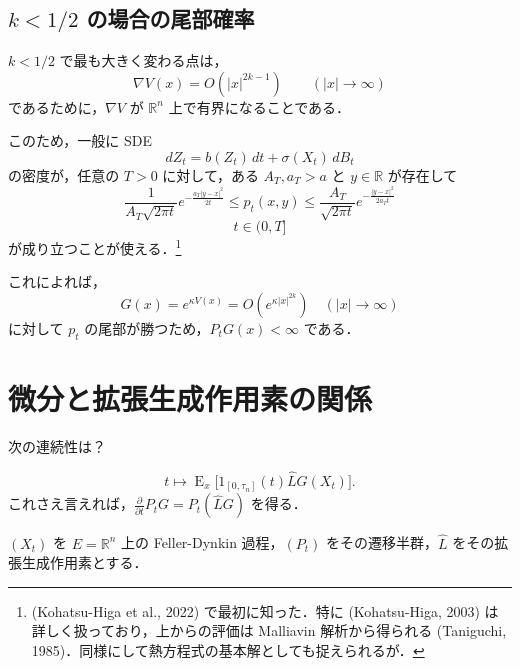 \documentclass[
]{article}
\begin{document}
\subsection{\texorpdfstring{\(k<1/2\)
の場合の尾部確率}{k\textless1/2 の場合の尾部確率}}\label{k12-ux306eux5834ux5408ux306eux5c3eux90e8ux78baux7387}

\(k<1/2\) で最も大きく変わる点は， \[
\nabla V(x)=O(\lvert x\rvert^{2k-1})\qquad(\lvert x\rvert\to\infty)
\] であるために，\(\nabla V\) が \(\mathbb{R}^n\)
上で有界になることである．

このため，一般に SDE \[
dZ_t=b(Z_t)\,dt+\sigma(X_t)\,dB_t
\] の密度が，任意の \(T>0\) に対して，ある \(A_T,a_T>a\) と
\(y\in\mathbb{R}\) が存在して \[
\frac{1}{A_T\sqrt{2\pi t}}e^{-\frac{a_T\lvert y-x\rvert^2}{2t}}\le p_t(x,y)\le\frac{A_T}{\sqrt{2\pi t}}e^{-\frac{\lvert y-x\rvert^2}{2a_Tt}}
\] \[
t\in(0,T]
\] が成り立つことが使える．\footnote{(Kohatsu-Higa et al., 2022)
  で最初に知った．特に (Kohatsu-Higa, 2003)
  は詳しく扱っており，上からの評価は Malliavin 解析から得られる
  (Taniguchi, 1985)．同様にして熱方程式の基本解としても捉えられるが．}

これによれば， \[
G(x)=e^{\kappa V(x)}=O(e^{\kappa\lvert x\rvert^{2k}})\quad(\lvert x\rvert\to\infty)
\] に対して \(p_t\) の尾部が勝つため，\(P_tG(x)<\infty\) である．

\section{微分と拡張生成作用素の関係}\label{ux5faeux5206ux3068ux62e1ux5f35ux751fux6210ux4f5cux7528ux7d20ux306eux95a2ux4fc2}

\begin{tcolorbox}[enhanced jigsaw, colback=white, breakable, left=2mm, arc=.35mm, colframe=quarto-callout-tip-color-frame, leftrule=.75mm, bottomrule=.15mm, rightrule=.15mm, opacityback=0, toprule=.15mm]

次の連続性は？

\[
t\mapsto\operatorname{E}_x\biggl[1_{[0,\tau_n]}(t)\widehat{L}G(X_t)\biggr].
\]
これさえ言えれば，\(\frac{\partial }{\partial t}P_tG=P_t(\widehat{L}G)\)
を得る．

\end{tcolorbox}

\((X_t)\) を \(E=\mathbb{R}^n\) 上の Feller-Dynkin 過程，\((P_t)\)
をその遷移半群，\(\widehat{L}\) をその拡張生成作用素とする．
\end{document}
